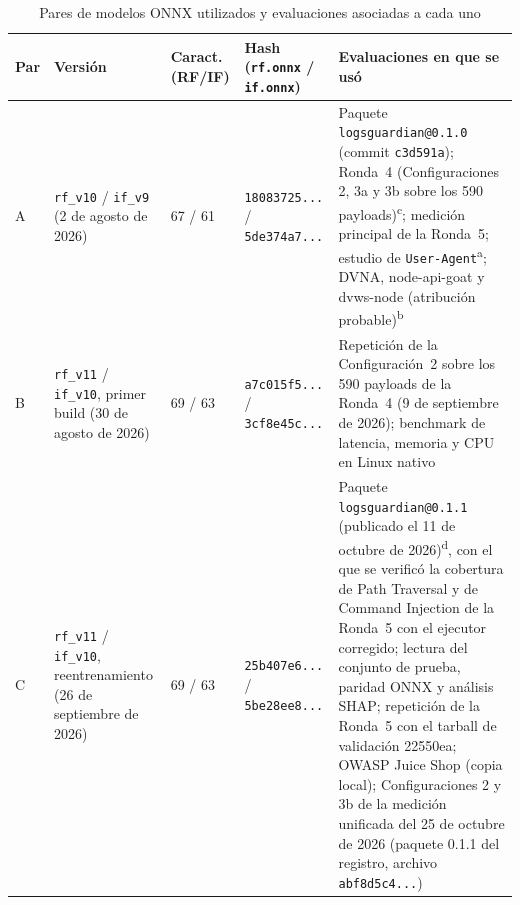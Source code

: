 \begin{table}[H]
\centering
\small
\begin{tabular}{|L{0.9cm}|L{2.6cm}|L{1.4cm}|L{2.6cm}|L{5.2cm}|}
\hline
\textbf{Par} & \textbf{Versión} & \textbf{Caract. (RF/IF)} & \textbf{Hash (\texttt{rf.onnx} / \texttt{if.onnx})} & \textbf{Evaluaciones en que se usó} \\ \hline
A & \texttt{rf\_v10} / \texttt{if\_v9} (2 de agosto de 2026) & 67 / 61 & \texttt{18083725...} / \texttt{5de374a7...} & Paquete \texttt{logsguardian@0.1.0} (commit \texttt{c3d591a}); Ronda~4 (Configuraciones 2, 3a y 3b sobre los 590 payloads)\textsuperscript{c}; medición principal de la Ronda~5; estudio de \texttt{User-Agent}\textsuperscript{a}; DVNA, node-api-goat y dvws-node (atribución probable)\textsuperscript{b} \\ \hline
B & \texttt{rf\_v11} / \texttt{if\_v10}, primer build (30 de agosto de 2026) & 69 / 63 & \texttt{a7c015f5...} / \texttt{3cf8e45c...} & Repetición de la Configuración~2 sobre los 590 payloads de la Ronda~4 (9 de septiembre de 2026); benchmark de latencia, memoria y CPU en Linux nativo \\ \hline
C & \texttt{rf\_v11} / \texttt{if\_v10}, reentrenamiento (26 de septiembre de 2026) & 69 / 63 & \texttt{25b407e6...} / \texttt{5be28ee8...} & Paquete \texttt{logsguardian@0.1.1} (publicado el 11 de octubre de 2026)\textsuperscript{d}, con el que se verificó la cobertura de Path Traversal y de Command Injection de la Ronda~5 con el ejecutor corregido; lectura del conjunto de prueba, paridad ONNX y análisis SHAP; repetición de la Ronda~5 con el tarball de validación 22550ea; OWASP Juice Shop (copia local); Configuraciones 2 y 3b de la medición unificada del 25 de octubre de 2026 (paquete 0.1.1 del registro, archivo \texttt{abf8d5c4...}) \\ \hline
\end{tabular}
\caption[Pares de modelos ONNX y su uso]{Pares de modelos ONNX utilizados y evaluaciones asociadas a cada uno}
\label{tab:pares-modelos}
\end{table}
